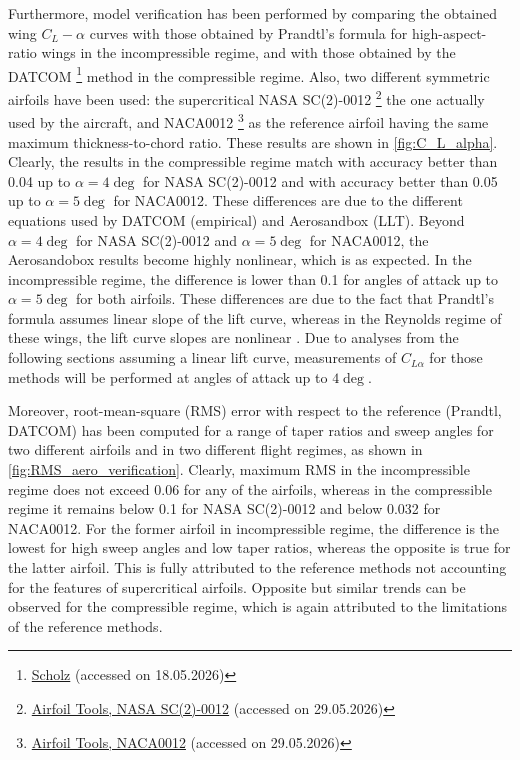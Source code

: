 Furthermore, model verification has been performed by comparing the obtained wing $C_L-\alpha$ curves with those obtained by  Prandtl's formula for high-aspect-ratio wings \cite[p. 443]{anderson2011ebook} in the incompressible regime, and with those obtained by the DATCOM \footnote{\href{https://www.fzt.haw-hamburg.de/pers/Scholz/HOOU/AircraftDesign_7_WingDesign.pdf}{Scholz} (accessed on 18.05.2026)} method in the compressible regime. Also, two different symmetric airfoils have been used: the supercritical NASA SC(2)-0012 \footnote{\label{nasasc(2)-0012}\href{http://airfoiltools.com/airfoil/details?airfoil=sc20012-il}{Airfoil Tools, NASA SC(2)-0012} (accessed on 29.05.2026)} the one actually used by the aircraft, and NACA0012 \footnote{\label{naca0012}\href{http://airfoiltools.com/airfoil/details?airfoil=n0012-il}{Airfoil Tools, NACA0012} (accessed on 29.05.2026)} as the reference airfoil having the same maximum thickness-to-chord ratio. These results are shown in \autoref{fig:C_L_alpha}. Clearly, the results in the compressible regime match with accuracy better than 0.04 up to $\alpha=4\deg$ for NASA SC(2)-0012 and with accuracy better than 0.05 up to $\alpha=5\deg$ for NACA0012. These differences are due to the different equations used by DATCOM (empirical) and Aerosandbox (LLT). Beyond $\alpha=4\deg$ for NASA SC(2)-0012 and $\alpha=5\deg$ for NACA0012, the Aerosandobox results become highly nonlinear, which is as expected. In the incompressible regime, the difference is lower than 0.1 for angles of attack up to $\alpha=5\deg$ for both airfoils. These differences are due to the fact that Prandtl's formula assumes linear slope of the lift curve, whereas in the Reynolds regime of these wings, the lift curve slopes are nonlinear . Due to analyses from the following sections assuming a linear lift curve, measurements of $C_{L{\alpha}}$ for those methods will be performed at angles of attack up to $4 \deg$.

Moreover, root-mean-square (RMS) error with respect to the reference (Prandtl, DATCOM) has been computed for a range of taper ratios and sweep angles for two different airfoils and in two different flight regimes, as shown in \autoref{fig:RMS_aero_verification}. Clearly, maximum RMS in the incompressible regime does not exceed 0.06 for any of the airfoils, whereas in the compressible regime it remains below 0.1 for NASA SC(2)-0012 and below 0.032 for NACA0012. For the former airfoil in incompressible regime, the difference is the lowest for high sweep angles and low taper ratios, whereas the opposite is true for the latter airfoil. This is fully attributed to the reference methods not accounting for the features of supercritical airfoils. Opposite but similar trends can be observed for the compressible regime, which is again attributed to the limitations of the reference methods.

